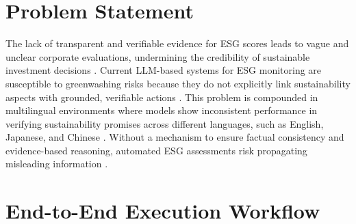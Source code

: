 \documentclass{article}
\begin{document}
\section{Problem Statement}
The lack of transparent and verifiable evidence for ESG scores leads to vague and unclear corporate evaluations, undermining the credibility of sustainable investment decisions \citep{kannan-seki-2023-textual}. Current LLM-based systems for ESG monitoring are susceptible to greenwashing risks because they do not explicitly link sustainability aspects with grounded, verifiable actions \citep{ong-etal-2025-towards-robust}. This problem is compounded in multilingual environments where models show inconsistent performance in verifying sustainability promises across different languages, such as English, Japanese, and Chinese \citep{huang-etal-2025-multilingual-promise}. Without a mechanism to ensure factual consistency and evidence-based reasoning, automated ESG assessments risk propagating misleading information \citep{mesgar-etal-2021-improving, henning-etal-2023-answer}.
\clearpage
\section{End-to-End Execution Workflow}
\end{document}

